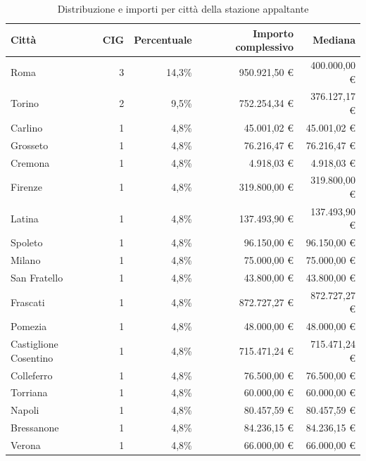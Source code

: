 \begin{table}[htbp]
\centering
\small
\caption{Distribuzione e importi per città della stazione appaltante}
\begin{tabular}{lrrrr}
\toprule
Città & CIG & Percentuale & Importo complessivo & Mediana \\
\midrule
Roma & 3 & 14,3\% & 950.921,50 € & 400.000,00 € \\
Torino & 2 & 9,5\% & 752.254,34 € & 376.127,17 € \\
Carlino & 1 & 4,8\% & 45.001,02 € & 45.001,02 € \\
Grosseto & 1 & 4,8\% & 76.216,47 € & 76.216,47 € \\
Cremona & 1 & 4,8\% & 4.918,03 € & 4.918,03 € \\
Firenze & 1 & 4,8\% & 319.800,00 € & 319.800,00 € \\
Latina & 1 & 4,8\% & 137.493,90 € & 137.493,90 € \\
Spoleto & 1 & 4,8\% & 96.150,00 € & 96.150,00 € \\
Milano & 1 & 4,8\% & 75.000,00 € & 75.000,00 € \\
San Fratello & 1 & 4,8\% & 43.800,00 € & 43.800,00 € \\
Frascati & 1 & 4,8\% & 872.727,27 € & 872.727,27 € \\
Pomezia & 1 & 4,8\% & 48.000,00 € & 48.000,00 € \\
Castiglione Cosentino & 1 & 4,8\% & 715.471,24 € & 715.471,24 € \\
Colleferro & 1 & 4,8\% & 76.500,00 € & 76.500,00 € \\
Torriana & 1 & 4,8\% & 60.000,00 € & 60.000,00 € \\
Napoli & 1 & 4,8\% & 80.457,59 € & 80.457,59 € \\
Bressanone & 1 & 4,8\% & 84.236,15 € & 84.236,15 € \\
Verona & 1 & 4,8\% & 66.000,00 € & 66.000,00 € \\
\bottomrule
\end{tabular}
\end{table}
